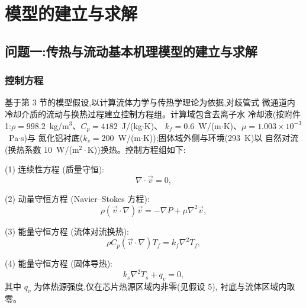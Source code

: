 \section{模型的建立与求解}

\subsection{问题一:传热与流动基本机理模型的建立与求解}

\subsubsection{控制方程}

基于第 3 节的模型假设,以计算流体力学与传热学理论\cite{White2016,Yang2006}为依据,对歧管式
微通道内冷却介质的流动与换热过程建立控制方程组。计算域包含去离子水
冷却液(按附件 1:$\rho = 998.2$~kg/m$^3$、$C_p = 4182$~J/(kg$\cdot$K)、
$k_f = 0.6$~W/(m$\cdot$K)、$\mu = 1.003\times10^{-3}$~Pa$\cdot$s)与
氮化铝衬底($k_s = 200$~W/(m$\cdot$K));固体域外侧与环境(293~K)以
自然对流(换热系数 $10$~W/(m$^2\cdot$K))换热。控制方程组如下:

(1) 连续性方程 (质量守恒):
\begin{equation}
  \nabla \cdot \vec{v} = 0,
  \label{eq:continuity}
\end{equation}

(2) 动量守恒方程 (Navier--Stokes 方程):
\begin{equation}
  \rho (\vec{v} \cdot \nabla)\vec{v} = -\nabla P + \mu \nabla^2 \vec{v},
  \label{eq:navier}
\end{equation}

(3) 能量守恒方程 (流体对流换热):
\begin{equation}
  \rho C_p (\vec{v} \cdot \nabla)T_f = k_f \nabla^2 T_f,
  \label{eq:energy-fluid}
\end{equation}

(4) 能量守恒方程 (固体导热):
\begin{equation}
  k_s \nabla^2 T_s + q_v = 0,
  \label{eq:energy-solid}
\end{equation}
其中 $q_v$ 为体热源强度,仅在芯片热源区域内非零(见假设 5),
衬底与流体区域内取零。

